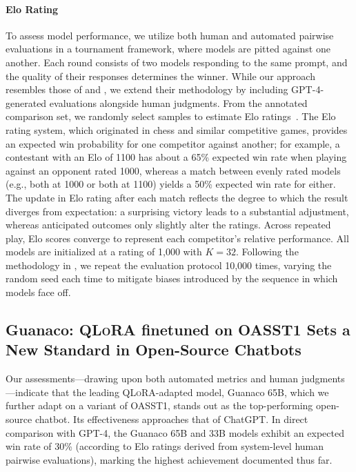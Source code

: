 \paragraph{Elo Rating} To assess model performance, we utilize both human and automated pairwise evaluations in a tournament framework, where models are pitted against one another. Each round consists of two models responding to the same prompt, and the quality of their responses determines the winner. While our approach resembles those of \citet{bai2022training} and \citet{vicuna2023}, we extend their methodology by including GPT-4-generated evaluations alongside human judgments. From the annotated comparison set, we randomly select samples to estimate Elo ratings~\citep{elo1967proposed,elo1978rating}. The Elo rating system, which originated in chess and similar competitive games, provides an expected win probability for one competitor against another; for example, a contestant with an Elo of 1100 has about a 65\% expected win rate when playing against an opponent rated 1000, whereas a match between evenly rated models (e.g., both at 1000 or both at 1100) yields a 50\% expected win rate for either. The update in Elo rating after each match reflects the degree to which the result diverges from expectation: a surprising victory leads to a substantial adjustment, whereas anticipated outcomes only slightly alter the ratings. Across repeated play, Elo scores converge to represent each competitor’s relative performance. All models are initialized at a rating of 1,000 with $K=32$. Following the methodology in \citet{vicuna2023}, we repeat the evaluation protocol 10,000 times, varying the random seed each time to mitigate biases introduced by the sequence in which models face off.

\subsection{\textbf{Guanaco}: \textsc{QLoRA} finetuned on OASST1 Sets a New Standard in Open-Source Chatbots}

Our assessments—drawing upon both automated metrics and human judgments—indicate that the leading \textsc{QLoRA}-adapted model, {Guanaco} 65B, which we further adapt on a variant of OASST1, stands out as the top-performing open-source chatbot. Its effectiveness approaches that of ChatGPT. In direct comparison with GPT-4, the {Guanaco} 65B and 33B models exhibit an expected win rate of 30\% (according to Elo ratings derived from system-level human pairwise evaluations), marking the highest achievement documented thus far.

